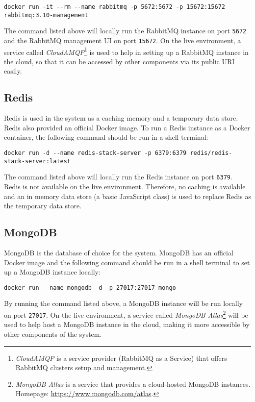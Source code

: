  \begin{lstlisting}[caption={Running a RabbitMQ instance with Docker (Shell)}]
 docker run -it --rm --name rabbitmq -p 5672:5672 -p 15672:15672 rabbitmq:3.10-management 
 \end{lstlisting}

 The command listed above will locally run the RabbitMQ instance on port \verb;5672; and the RabbitMQ management UI on port \verb;15672;. On the live environment, a service called \emph{CloudAMQP}\footnote{\emph{CloudAMQP} is a service provider (RabbitMQ as a Service) that offers RabbitMQ clusters setup and management.} is used to help in setting up a RabbitMQ instance in the cloud, so that it can be accessed by other components via its public URI easily.

 \subsection{Redis}
 Redis is used in the system as a caching memory and a temporary data store. Redis also provided an official Docker image. To run a Redis instance as a Docker container, the following command should be run in a shell terminal:

 \begin{lstlisting}[caption={Running a Redis instance with Docker (Shell)}]
 docker run -d --name redis-stack-server -p 6379:6379 redis/redis-stack-server:latest
 \end{lstlisting}

 The command listed above will locally run the Redis instance on port \verb;6379;. Redis is not available on the live environment. Therefore, no caching is available and an in memory data store (a basic JavaScript class) is used to replace Redis as the temporary data store.

 \subsection{MongoDB}
 MongoDB is the database of choice for the system. MongoDB has an official Docker image and the following command should be run in a shell terminal to set up a MongoDB instance locally:

 \begin{lstlisting}[caption={Running a MongoDB instance with Docker (Shell)}]
 docker run --name mongodb -d -p 27017:27017 mongo 
 \end{lstlisting}

 By running the command listed above, a MongoDB instance will be run locally on port \verb;27017;. On the live environment, a service called \emph{MongoDB Atlas}\footnote{\emph{MongoDB Atlas} is a service that provides a cloud-hosted MongoDB instances. Homepage: \url{https://www.mongodb.com/atlas}.} will be used to help host a MongoDB instance in the cloud, making it more accessible by other components of the system.
 


